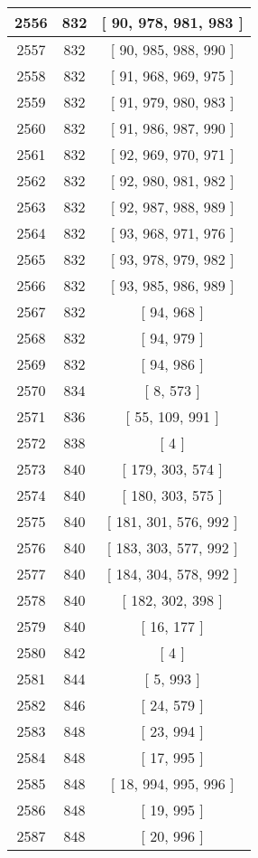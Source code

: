 \begin{center}
\begin{longtable}[H]{|| c c c ||}
\hline
2556 & 832 & [ 90, 978, 981, 983 ] \\ 
\hline
2557 & 832 & [ 90, 985, 988, 990 ] \\ 
\hline
2558 & 832 & [ 91, 968, 969, 975 ] \\ 
\hline
2559 & 832 & [ 91, 979, 980, 983 ] \\ 
\hline
2560 & 832 & [ 91, 986, 987, 990 ] \\ 
\hline
2561 & 832 & [ 92, 969, 970, 971 ] \\ 
\hline
2562 & 832 & [ 92, 980, 981, 982 ] \\ 
\hline
2563 & 832 & [ 92, 987, 988, 989 ] \\ 
\hline
2564 & 832 & [ 93, 968, 971, 976 ] \\ 
\hline
2565 & 832 & [ 93, 978, 979, 982 ] \\ 
\hline
2566 & 832 & [ 93, 985, 986, 989 ] \\ 
\hline
2567 & 832 & [ 94, 968 ] \\ 
\hline
2568 & 832 & [ 94, 979 ] \\ 
\hline
2569 & 832 & [ 94, 986 ] \\ 
\hline
2570 & 834 & [ 8, 573 ] \\ 
\hline
2571 & 836 & [ 55, 109, 991 ] \\ 
\hline
2572 & 838 & [ 4 ] \\ 
\hline
2573 & 840 & [ 179, 303, 574 ] \\ 
\hline
2574 & 840 & [ 180, 303, 575 ] \\ 
\hline
2575 & 840 & [ 181, 301, 576, 992 ] \\ 
\hline
2576 & 840 & [ 183, 303, 577, 992 ] \\ 
\hline
2577 & 840 & [ 184, 304, 578, 992 ] \\ 
\hline
2578 & 840 & [ 182, 302, 398 ] \\ 
\hline
2579 & 840 & [ 16, 177 ] \\ 
\hline
2580 & 842 & [ 4 ] \\ 
\hline
2581 & 844 & [ 5, 993 ] \\ 
\hline
2582 & 846 & [ 24, 579 ] \\ 
\hline
2583 & 848 & [ 23, 994 ] \\ 
\hline
2584 & 848 & [ 17, 995 ] \\ 
\hline
2585 & 848 & [ 18, 994, 995, 996 ] \\ 
\hline
2586 & 848 & [ 19, 995 ] \\ 
\hline
2587 & 848 & [ 20, 996 ] \\ 
\hline

\end{longtable}
\end{center}
